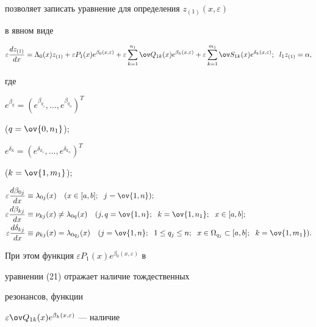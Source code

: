 позволяет записать уравнение для определения $z_{(1)}(x,\varepsilon)$ 


в явном виде 


\begin{equation} 


\varepsilon\frac{dz_{(1)}}{dx}=\Lambda_0(x)z_{(1)}+ 


\varepsilon P_1(x)e^{\beta_0(x,\varepsilon)}+\varepsilon 


\sum^{n_1}_{k=1}\ov Q_{1k}(x)e^{\beta_k(x,\varepsilon)}+ 


\varepsilon\sum^{m_1}_{k=1}\ov S_{1k}(x) 


e^{\delta_k(x,\varepsilon)};\ \; l_1z_{(1)}=\alpha, 


\end{equation} 


где 


$e^{\beta_q}=(e^{\beta_{q_1}},\dotsc,e^{\beta_{q_n}})^T$


($q=\ov{0,n_1}$);


$e^{\delta_k}=(e^{\delta_{k_1}},\dotsc,e^{\delta_{k_n}})^T$


($k=\ov{1,m_1}$); 


\begin{align*} 


\varepsilon\frac{d\beta_{0j}}{dx}&\equiv\lambda_{0j}(x)\quad 


(x\in[a,b];\ \; j=\ov{1,n});\\ 


%


\varepsilon\frac{d\beta_{kj}}{dx}&\equiv\nu_{kj}(x)\ne 


\lambda_{0q}(x)\quad (j,q=\ov{1,n};\ \; k=\ov{1,n_1}; 


\ \;x\in[a,b];\\ 


%


\varepsilon\frac{d\delta_{kj}}{dx}&\equiv\rho_{kj}(x)= 


\lambda_{0q_j}(x)\quad (j=\ov{1,n};\ \; 1\le q_j\le n; 


\ \; x\in\Omega_{q_j}\subset[a,b];\ \; k=\ov{1,m_1}). 


\end{align*} 


При этом функция $\varepsilon P_1(x)e^{\beta_0(x,\varepsilon)}$ в 


уравнении (21) отражает наличие тождественных 


резонансов, функции 


$\varepsilon\ov Q_{1k}(x)e^{\beta_k(x,\varepsilon)}$ --- наличие 


